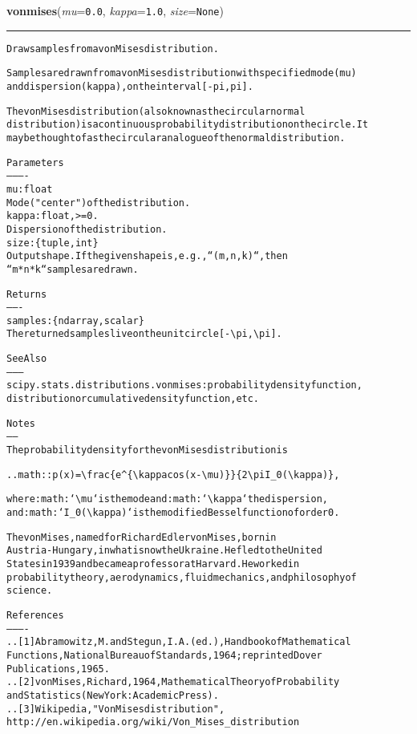 \hspace{.8\funcindent}\begin{boxedminipage}{\funcwidth}

    \raggedright \textbf{vonmises}(\textit{mu}={\tt 0.0}, \textit{kappa}={\tt 1.0}, \textit{size}={\tt None})

    \vspace{-1.5ex}

    \rule{\textwidth}{0.5\fboxrule}
\setlength{\parskip}{2ex}
\begin{alltt}
Draw samples from a von Mises distribution.

Samples are drawn from a von Mises distribution with specified mode (mu)
and dispersion (kappa), on the interval [-pi, pi].

The von Mises distribution (also known as the circular normal
distribution) is a continuous probability distribution on the circle. It
may be thought of as the circular analogue of the normal distribution.

Parameters
----------
mu : float
    Mode ("center") of the distribution.
kappa : float, {\textgreater}= 0.
    Dispersion of the distribution.
size : \{tuple, int\}
    Output shape.  If the given shape is, e.g., ``(m, n, k)``, then
    ``m * n * k`` samples are drawn.

Returns
-------
samples : \{ndarray, scalar\}
    The returned samples live on the unit circle [-{\textbackslash}pi, {\textbackslash}pi].

See Also
--------
scipy.stats.distributions.vonmises : probability density function,
    distribution or cumulative density function, etc.

Notes
-----
The probability density for the von Mises distribution is

.. math:: p(x) = {\textbackslash}frac\{e{\textasciicircum}\{{\textbackslash}kappa cos(x-{\textbackslash}mu)\}\}\{2{\textbackslash}pi I\_0({\textbackslash}kappa)\},

where :math:`{\textbackslash}mu` is the mode and :math:`{\textbackslash}kappa` the dispersion,
and :math:`I\_0({\textbackslash}kappa)` is the modified Bessel function of order 0.

The von Mises, named for Richard Edler von Mises, born in
Austria-Hungary, in what is now the Ukraine. He fled to the United
States in 1939 and became a professor at Harvard. He worked in
probability theory, aerodynamics, fluid mechanics, and philosophy of
science.

References
----------
.. [1] Abramowitz, M. and Stegun, I. A. (ed.), Handbook of Mathematical
       Functions, National Bureau of Standards, 1964; reprinted Dover
       Publications, 1965.
.. [2] von Mises, Richard, 1964, Mathematical Theory of Probability
       and Statistics (New York: Academic Press).
.. [3] Wikipedia, "Von Mises distribution",
       http://en.wikipedia.org/wiki/Von\_Mises\_distribution


\end{alltt}
\end{boxedminipage}
